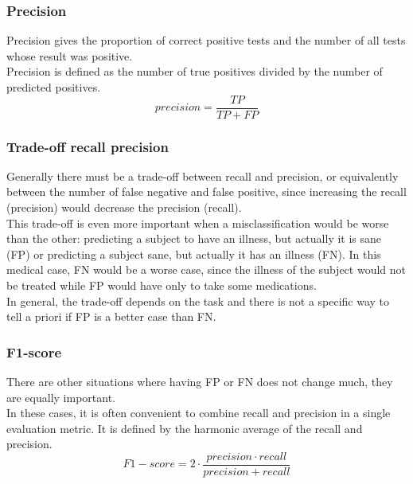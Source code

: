 \subsubsection{Precision}
Precision gives the proportion of correct positive tests and the number of all tests whose result was positive.\\
Precision is defined as the number of true positives divided by the number of predicted positives.
\[
precision = \frac{TP}{TP + FP}
\]
\subsubsection{Trade-off recall precision}
Generally there must be a trade-off between recall and precision, or equivalently between the number of false negative and false positive, since increasing the recall (precision) would decrease the precision (recall). \\

This trade-off is even more important when a misclassification would be worse than the other: predicting a subject to have an illness, but actually it is sane (\gls{FP}) or predicting a subject sane, but actually it has an illness (\gls{FN}). In this medical case, \gls{FN} would be a worse case, since the illness of the subject would not be treated while \gls{FP} would have only to take some medications. \\
In general, the trade-off depends on the task and there is not a specific way to tell a priori if \gls{FP} is a better case than \gls{FN}.

\subsubsection{F1-score}
There are other situations where having \gls{FP} or \gls{FN} does not change much, they are equally important.\\
In these cases, it is often convenient to combine recall and precision in a single evaluation metric. It is defined by the harmonic average of the recall and precision.
\[
F1\!-\!score = 2\cdot \frac{precision \cdot recall}{precision + recall}
\]


